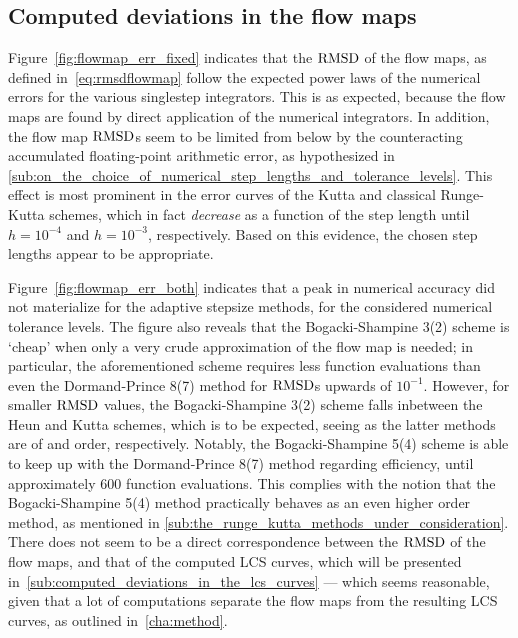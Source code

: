 \subsection{Computed deviations in the flow maps}
\label{sub:computed_deviations_in_the_flow_maps}
Figure~\ref{fig:flowmap_err_fixed} indicates that the $\operatorname{RMSD}$ of the flow maps,
as defined in~\cref{eq:rmsdflowmap} follow the expected power laws
of the numerical errors for the various singlestep integrators. This is
as expected, because the flow maps are found by direct application of the
numerical integrators. In addition, the flow map $\operatorname{RMSD}$s seem to be limited
from below by the counteracting accumulated floating-point
arithmetic error, as hypothesized in
\cref{sub:on_the_choice_of_numerical_step_lengths_and_tolerance_levels}.
This effect is most prominent in the error curves of the Kutta and
classical Runge-Kutta schemes, which in fact \emph{decrease} as a function
of the step length until $h=10^{-4}$ and $h=10^{-3}$, respectively. Based on
this evidence, the chosen step lengths appear to be appropriate.

Figure~\ref{fig:flowmap_err_both} indicates that a peak in numerical accuracy
did not materialize for the adaptive stepsize methods, for the considered
numerical tolerance levels. The figure also reveals that the Bogacki-Shampine
3(2) scheme is `cheap' when only a very crude approximation of the flow map is
needed; in particular, the aforementioned scheme requires less function
evaluations than even the Dormand-Prince 8(7) method for $\operatorname{RMSD}$s upwards of
$10^{-1}$. However, for smaller $\operatorname{RMSD}$ values, the Bogacki-Shampine 3(2)
scheme falls inbetween the Heun and Kutta schemes, which is to be expected,
seeing as the latter methods are of  and  order, respectively.
Notably, the Bogacki-Shampine 5(4) scheme is able to keep up with the
Dormand-Prince 8(7) method regarding efficiency, until approximately $600$
function evaluations. This complies with the notion that the Bogacki-Shampine
5(4) method practically behaves as an even higher order method, as mentioned in
\cref{sub:the_runge_kutta_methods_under_consideration}.
There does not seem to be a direct correspondence between the
$\operatorname{RMSD}$ of the flow maps, and that of the computed LCS curves, which will be
presented in~\cref{sub:computed_deviations_in_the_lcs_curves} --- which seems
reasonable, given that a lot of computations separate the flow maps from the
resulting LCS curves, as outlined in~\cref{cha:method}.




